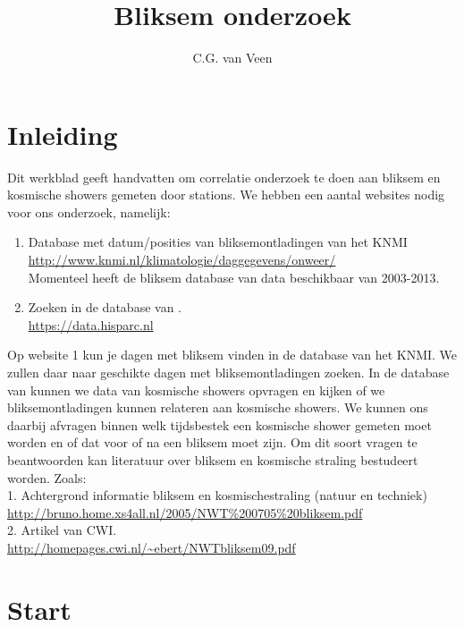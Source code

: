 

\title{Bliksem onderzoek}
\author{C.G. van Veen}



\maketitle

\section{Inleiding}

Dit werkblad geeft handvatten om correlatie onderzoek te doen aan bliksem en
kosmische showers gemeten door \hisparc stations.
We hebben een aantal websites nodig voor ons onderzoek, namelijk:
\begin{enumerate}
    \item Database met datum/posities van bliksemontladingen van het KNMI\\
    \url{ http://www.knmi.nl/klimatologie/daggegevens/onweer/} \\
    Momenteel heeft de bliksem database van \hisparc data beschikbaar van 2003-2013.
    \item Zoeken in de database van \hisparc.\\
    \url{https://data.hisparc.nl}
\end{enumerate}

Op website 1 kun je dagen met bliksem vinden in de database van het KNMI.
We zullen daar naar geschikte dagen met bliksemontladingen zoeken.
In de database van \hisparc kunnen we data van kosmische showers opvragen en
kijken of we bliksemontladingen kunnen relateren aan kosmische showers.
We kunnen ons daarbij afvragen binnen welk tijdsbestek een kosmische shower gemeten
moet worden en of dat voor of na een bliksem moet zijn. Om dit soort vragen te
beantwoorden kan literatuur over bliksem en kosmische straling bestudeert worden.
Zoals:\\
1. Achtergrond informatie bliksem en kosmischestraling (natuur en techniek)\\
\url{http://bruno.home.xs4all.nl/2005/NWT%200705%20bliksem.pdf}\\
2. Artikel van CWI.\\
\url{http://homepages.cwi.nl/~ebert/NWTbliksem09.pdf}\\

\section{Start}

